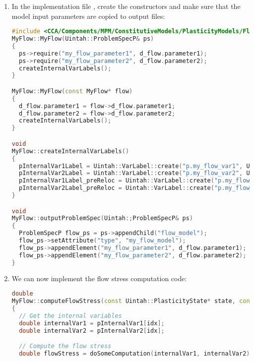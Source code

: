 \begin{enumerate}
\begin{lstlisting}[language=Cpp]
  private:
    MyFlowParameters d_flow;
    void createInternalVarLabels();
  }
}
#endif
\end{lstlisting}

  \item In the implementation file , create the constructors and make
        sure that the model input parameters are copied to output files:
\begin{lstlisting}[language=Cpp]
#include <CCA/Components/MPM/ConstitutiveModels/PlasticityModels/FlowModel.h>
MyFlow::MyFlow(Uintah::ProblemSpecP& ps) 
{
  ps->require("my_flow_parameter1", d_flow.parameter1);
  ps->require("my_flow_parameter2", d_flow.parameter2);
  createInternalVarLabels();
}

MyFlow::MyFlow(const MyFlow* flow)
{
  d_flow.parameter1 = flow->d_flow.parameter1;
  d_flow.parameter2 = flow->d_flow.parameter2;
  createInternalVarLabels();
}

void
MyFlow::createInternalVarLabels()
{
  pInternalVar1Label = Uintah::VarLabel::create("p.my_flow_var1", Uintah::ParticleVariable<double>::getTypeDescription());
  pInternalVar2Label = Uintah::VarLabel::create("p.my_flow_var2", Uintah::ParticleVariable<double>::getTypeDescription());
  pInternalVar1Label_preReloc = Uintah::VarLabel::create("p.my_flow_var1+", Uintah::ParticleVariable<double>::getTypeDescription());
  pInternalVar2Label_preReloc = Uintah::VarLabel::create("p.my_flow_var2+", Uintah::ParticleVariable<double>::getTypeDescription());
}

void
MyFlow::outputProblemSpec(Uintah:;ProblemSpecP& ps)
{
  ProblemSpecP flow_ps = ps->appendChild("flow_model");
  flow_ps->setAttribute("type", "my_flow_model");
  flow_ps->appendElement("my_flow_parameter1", d_flow.parameter1);
  flow_ps->appendElement("my_flow_parameter2", d_flow.parameter2);
}
\end{lstlisting}

  \item We can now implement the flow stress computation code:
\begin{lstlisting}[language=Cpp]
double
MyFlow::computeFlowStress(const Uintah::PlasticityState* state, const double&, const double&, const Uintah::MPMMaterial*, const Uintah::particleIndex idx)
{
  // Get the internal variables
  double internalVar1 = pInternalVar1[idx];
  double internalVar2 = pInternalVar2[idx];

  // Compute the flow stress
  double flowStress = doSomeComputation(internalVar1, internalVar2);


\end{lstlisting}
\end{enumerate}
